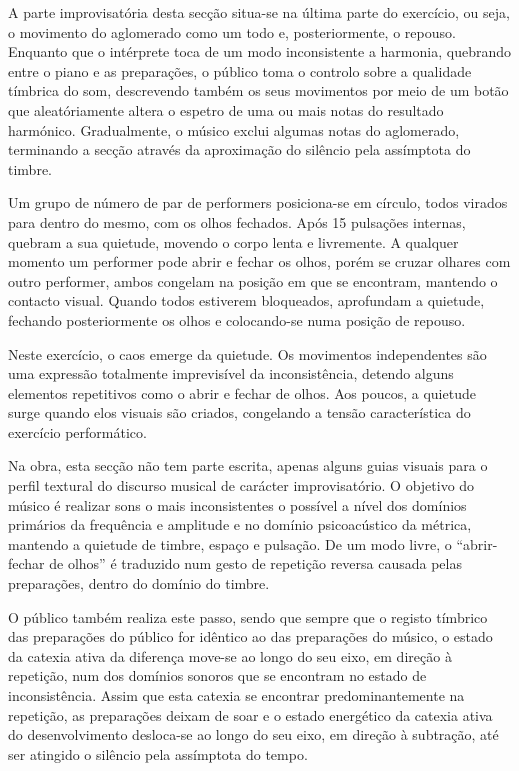 \documentclass[../main.tex]{subfiles}
\begin{document}
A parte improvisatória desta secção situa-se na última parte do exercício, ou seja, o movimento do aglomerado como um todo e, posteriormente, o repouso. Enquanto que o intérprete toca de um modo inconsistente a harmonia, quebrando entre o piano e as preparações, o público toma o controlo sobre a qualidade tímbrica do som, descrevendo também os seus movimentos por meio de um botão que aleatóriamente altera o espetro de uma ou mais notas do resultado harmónico. Gradualmente, o músico exclui algumas notas do aglomerado, terminando a secção através da aproximação do silêncio pela assímptota do timbre.

\begin{performex}
    Um grupo de número de par de performers posiciona-se em círculo, todos virados para dentro do mesmo, com os olhos fechados. Após 15 pulsações internas, quebram a sua quietude, movendo o corpo lenta e livremente. A qualquer momento um performer pode abrir e fechar os olhos, porém se cruzar olhares com outro performer, ambos congelam na posição em que se encontram, mantendo o contacto visual. Quando todos estiverem bloqueados, aprofundam a quietude, fechando posteriormente os olhos e colocando-se numa posição de repouso.
\end{performex}

Neste exercício, o caos emerge da quietude. Os movimentos independentes são uma expressão totalmente imprevisível da inconsistência, detendo alguns elementos repetitivos como o abrir e fechar de olhos. Aos poucos, a quietude surge quando elos visuais são criados, congelando a tensão característica do exercício performático.

Na obra, esta secção não tem parte escrita, apenas alguns guias visuais para o perfil textural do discurso musical de carácter improvisatório. O objetivo do músico é realizar sons o mais inconsistentes o possível a nível dos domínios primários da frequência e amplitude e no domínio psicoacústico da métrica, mantendo a quietude de timbre, espaço e pulsação. De um modo livre, o \enquote{abrir-fechar de olhos} é traduzido num gesto de repetição reversa causada pelas preparações, dentro do domínio do timbre.

O público também realiza este passo, sendo que sempre que o registo tímbrico das preparações do público for idêntico ao das preparações do músico, o estado da catexia ativa da diferença move-se ao longo do seu eixo, em direção à repetição, num dos domínios sonoros que se encontram no estado de inconsistência. Assim que esta catexia se encontrar predominantemente na repetição, as preparações deixam de soar e o estado energético da catexia ativa do desenvolvimento desloca-se ao longo do seu eixo, em direção à subtração, até ser atingido o silêncio pela assímptota do tempo.
\end{document}
